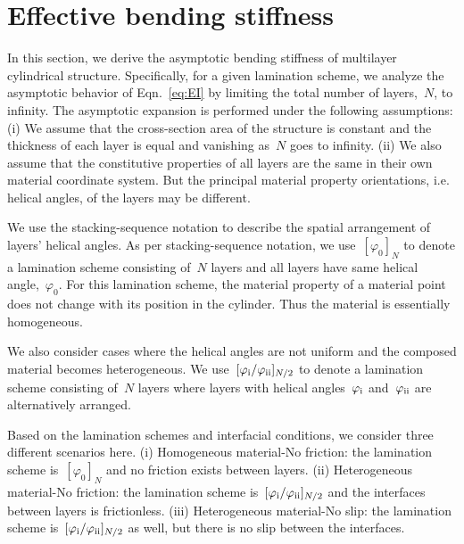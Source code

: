 \documentclass[preprint,12pt,times]{elsarticle}
\numberwithin{equation}{section}
\newcommand{\RN}[1]{%
  \textup{\uppercase\expandafter{\romannumeral#1}}%
}
\renewcommand{\>}{$\Rightarrow$}
\begin{document}






\section{Effective bending stiffness}
\label{sec:limit_analysis}
In this section, we derive the asymptotic bending stiffness of multilayer cylindrical structure.
Specifically, for a given lamination scheme, we analyze the asymptotic behavior of Eqn.~\eqref{eq:EI} by limiting the total number of layers,~$N$, to infinity.
The asymptotic expansion is performed under the following assumptions: (i) We assume that the cross-section area of the structure is constant and the thickness of each layer is equal and vanishing as~$N$ goes to infinity. (ii) We also assume that the constitutive properties of all layers are the same in their own material coordinate system. But the principal material property orientations, i.e. helical angles, of the layers may be different.

We use the stacking-sequence notation to describe the spatial arrangement of layers' helical angles. As per stacking-sequence notation, we use~$[\varphi_{0}]_N$ to denote a lamination scheme consisting of~$N$ layers and all layers have same helical angle,~$\varphi_{0}$.
For this lamination scheme, the material property of a material point does not change with its position in the cylinder. Thus the material is essentially homogeneous.


We also consider cases where the helical angles are not uniform and the composed material becomes heterogeneous. We use~$[\varphi_{\RN{1}}/\varphi_{\RN{2}}]_{N/2}$ to denote a lamination scheme consisting of~$N$ layers where layers with helical angles~$\varphi_{\RN{1}}$ and~$\varphi_{\RN{2}}$ are alternatively arranged.

Based on the lamination schemes and interfacial conditions, we consider three different scenarios here. (i) Homogeneous material-No friction: the lamination scheme is~$[\varphi_{0}]_N$ and no friction exists between layers. (ii) Heterogeneous material-No friction: the lamination scheme is~$[\varphi_{\RN{1}}/\varphi_{\RN{2}}]_{N/2}$ and the interfaces between layers is frictionless. (iii) Heterogeneous material-No slip: the lamination scheme is~$[\varphi_{\RN{1}}/\varphi_{\RN{2}}]_{N/2}$ as well, but there is no slip between the interfaces.
\end{document}
